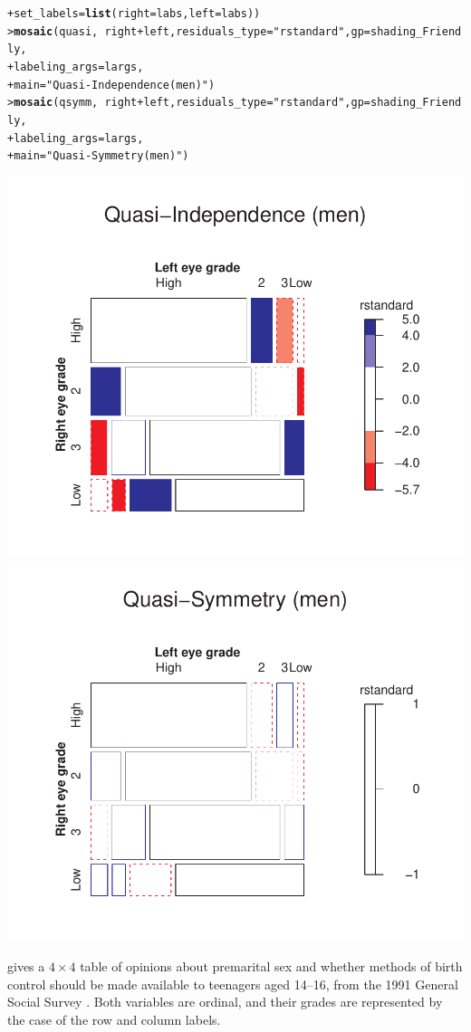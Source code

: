 \documentclass[10pt]{report}\usepackage[]{graphicx}\usepackage[]{color}
\makeatletter
\newcommand{\hlstr}[1]{\textcolor[rgb]{0.192,0.494,0.8}{#1}}%
\newcommand{\hlopt}[1]{\textcolor[rgb]{0,0,0}{#1}}%
\newcommand{\hlstd}[1]{\textcolor[rgb]{0.345,0.345,0.345}{#1}}%
\newcommand{\hlkwc}[1]{\textcolor[rgb]{0.333,0.667,0.333}{#1}}%
\newcommand{\hlkwd}[1]{\textcolor[rgb]{0.737,0.353,0.396}{\textbf{#1}}}%
\newenvironment{kframe}{%
 \def\at@end@of@kframe{}%
 \ifinner\ifhmode%
  \def\at@end@of@kframe{\end{minipage}}%
  \begin{minipage}{\columnwidth}%
 \fi\fi%
 \def\FrameCommand##1{\hskip\@totalleftmargin \hskip-\fboxsep
 \colorbox{shadecolor}{##1}\hskip-\fboxsep
     \hskip-\linewidth \hskip-\@totalleftmargin \hskip\columnwidth}%
 \MakeFramed {\advance\hsize-\width
   \@totalleftmargin\z@ \linewidth\hsize
   \@setminipage}}%
 {\par\unskip\endMakeFramed%
 \at@end@of@kframe}
\newenvironment{knitrout}{}{} %
\renewenvironment{knitrout}{\small\renewcommand{\baselinestretch}{.85}}{} %
\makeatother
\begin{document}
\begin{Exercises}
\begin{ans}
\begin{knitrout}
\begin{kframe}
\begin{alltt}
\hlstd{+ }              \hlkwc{set_labels}\hlstd{=}\hlkwd{list}\hlstd{(}\hlkwc{right}\hlstd{=labs,} \hlkwc{left}\hlstd{=labs))}
\hlstd{> }\hlkwd{mosaic}\hlstd{(quasi,} \hlopt{~}\hlstd{right} \hlopt{+} \hlstd{left,} \hlkwc{residuals_type}\hlstd{=}\hlstr{"rstandard"}\hlstd{,} \hlkwc{gp}\hlstd{=shading_Friendly,}
\hlstd{+ }       \hlkwc{labeling_args}\hlstd{=largs,}
\hlstd{+ }       \hlkwc{main}\hlstd{=}\hlstr{"Quasi-Independence (men)"}  \hlstd{)}
\hlstd{> }\hlkwd{mosaic}\hlstd{(qsymm,} \hlopt{~}\hlstd{right} \hlopt{+} \hlstd{left,} \hlkwc{residuals_type}\hlstd{=}\hlstr{"rstandard"}\hlstd{,} \hlkwc{gp}\hlstd{=shading_Friendly,}
\hlstd{+ }       \hlkwc{labeling_args}\hlstd{=largs,}
\hlstd{+ }       \hlkwc{main}\hlstd{=}\hlstr{"Quasi-Symmetry (men)"}\hlstd{)}
\end{alltt}
\end{kframe}

\centerline{\includegraphics[width=.5\textwidth]{soln/fig/ex10_1c-1} 
\includegraphics[width=.5\textwidth]{soln/fig/ex10_1c-2} }



\end{knitrout}

	
	\end{ans}


  \exercise {} gives a $4 \times 4$ table of opinions about
  premarital sex and whether methods of birth control should be made available
  to teenagers aged 14--16, from the 1991 General Social Survey
  \citep[Table 10.3]{Agresti:2013}.  Both variables are ordinal, and their
  grades are represented by the case of the row and column labels.



\end{Exercises}
\end{document}
